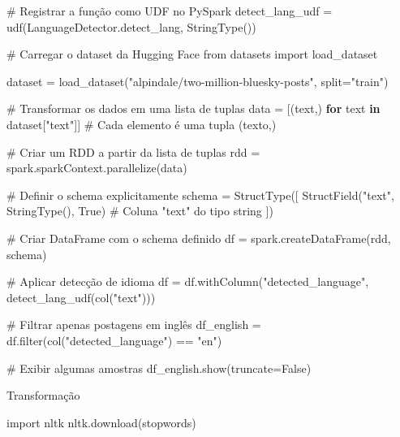 \documentclass[
  letterpaper,
  DIV=11,
  numbers=noendperiod]{scrartcl}
\newenvironment{Shaded}{\begin{snugshade}}{\end{snugshade}}
\newcommand{\BuiltInTok}[1]{\textcolor[rgb]{0.00,0.23,0.31}{#1}}
\newcommand{\CommentTok}[1]{\textcolor[rgb]{0.37,0.37,0.37}{#1}}
\newcommand{\ControlFlowTok}[1]{\textcolor[rgb]{0.00,0.23,0.31}{\textbf{#1}}}
\newcommand{\ImportTok}[1]{\textcolor[rgb]{0.00,0.46,0.62}{#1}}
\newcommand{\KeywordTok}[1]{\textcolor[rgb]{0.00,0.23,0.31}{\textbf{#1}}}
\newcommand{\NormalTok}[1]{\textcolor[rgb]{0.00,0.23,0.31}{#1}}
\newcommand{\OperatorTok}[1]{\textcolor[rgb]{0.37,0.37,0.37}{#1}}
\newcommand{\StringTok}[1]{\textcolor[rgb]{0.13,0.47,0.30}{#1}}
\newcommand{\VariableTok}[1]{\textcolor[rgb]{0.07,0.07,0.07}{#1}}
\begin{document}
\begin{Shaded}
\begin{Highlighting}[]
\CommentTok{\# Registrar a função como UDF no PySpark}
\NormalTok{detect\_lang\_udf }\OperatorTok{=}\NormalTok{ udf(LanguageDetector.detect\_lang, StringType())}

\CommentTok{\# Carregar o dataset da Hugging Face}
\ImportTok{from}\NormalTok{ datasets }\ImportTok{import}\NormalTok{ load\_dataset}

\NormalTok{dataset }\OperatorTok{=}\NormalTok{ load\_dataset(}\StringTok{"alpindale/two{-}million{-}bluesky{-}posts"}\NormalTok{, split}\OperatorTok{=}\StringTok{"train"}\NormalTok{)}

\CommentTok{\# Transformar os dados em uma lista de tuplas}
\NormalTok{data }\OperatorTok{=}\NormalTok{ [(text,) }\ControlFlowTok{for}\NormalTok{ text }\KeywordTok{in}\NormalTok{ dataset[}\StringTok{"text"}\NormalTok{]]  }\CommentTok{\# Cada elemento é uma tupla (texto,)}

\CommentTok{\# Criar um RDD a partir da lista de tuplas}
\NormalTok{rdd }\OperatorTok{=}\NormalTok{ spark.sparkContext.parallelize(data)}

\CommentTok{\# Definir o schema explicitamente}
\NormalTok{schema }\OperatorTok{=}\NormalTok{ StructType([}
\NormalTok{    StructField(}\StringTok{"text"}\NormalTok{, StringType(), }\VariableTok{True}\NormalTok{)  }\CommentTok{\# Coluna "text" do tipo string}
\NormalTok{])}

\CommentTok{\# Criar DataFrame com o schema definido}
\NormalTok{df }\OperatorTok{=}\NormalTok{ spark.createDataFrame(rdd, schema)}

\CommentTok{\# Aplicar detecção de idioma}
\NormalTok{df }\OperatorTok{=}\NormalTok{ df.withColumn(}\StringTok{"detected\_language"}\NormalTok{, detect\_lang\_udf(col(}\StringTok{"text"}\NormalTok{)))}

\CommentTok{\# Filtrar apenas postagens em inglês}
\NormalTok{df\_english }\OperatorTok{=}\NormalTok{ df.}\BuiltInTok{filter}\NormalTok{(col(}\StringTok{"detected\_language"}\NormalTok{) }\OperatorTok{==} \StringTok{"en"}\NormalTok{)}

\CommentTok{\# Exibir algumas amostras}
\NormalTok{df\_english.show(truncate}\OperatorTok{=}\VariableTok{False}\NormalTok{)}
\end{Highlighting}
\end{Shaded}

Transformação

\begin{Shaded}
\begin{Highlighting}[]
\ImportTok{import}\NormalTok{ nltk}
\NormalTok{nltk.download(}\StringTok{\textquotesingle{}stopwords\textquotesingle{}}\NormalTok{)}
\end{Highlighting}
\end{Shaded}
\end{document}
